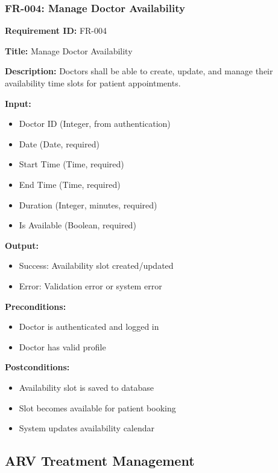 \documentclass[12pt,a4paper]{article}
\begin{document}
\subsubsection{FR-004: Manage Doctor Availability}

\textbf{Requirement ID:} FR-004

\textbf{Title:} Manage Doctor Availability

\textbf{Description:} Doctors shall be able to create, update, and manage their availability time slots for patient appointments.

\textbf{Input:}
\begin{itemize}
    \item Doctor ID (Integer, from authentication)
    \item Date (Date, required)
    \item Start Time (Time, required)
    \item End Time (Time, required)
    \item Duration (Integer, minutes, required)
    \item Is Available (Boolean, required)
\end{itemize}

\textbf{Output:}
\begin{itemize}
    \item Success: Availability slot created/updated
    \item Error: Validation error or system error
\end{itemize}

\textbf{Preconditions:}
\begin{itemize}
    \item Doctor is authenticated and logged in
    \item Doctor has valid profile
\end{itemize}

\textbf{Postconditions:}
\begin{itemize}
    \item Availability slot is saved to database
    \item Slot becomes available for patient booking
    \item System updates availability calendar
\end{itemize}

\subsection{ARV Treatment Management}
\end{document}
